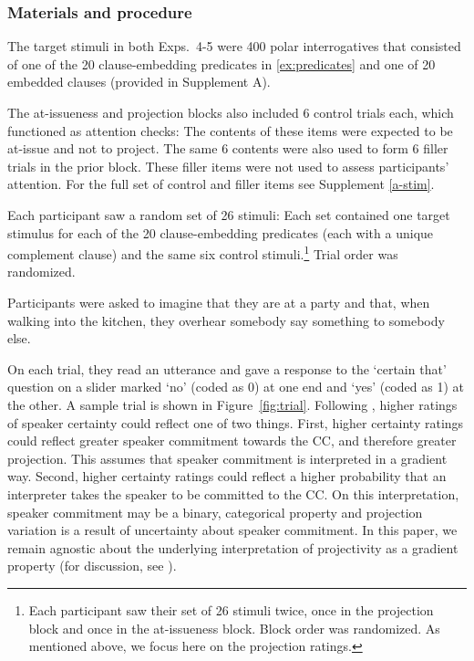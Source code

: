 \documentclass[times,linguex,xcolor]{glossa}
\begin{document}
    \subsubsection{Materials and procedure}
    
  The target stimuli in both Exps.~4-5 were 400 polar interrogatives that consisted of one of the 20 clause-embedding predicates in \ref{ex:predicates} and one of 20 embedded clauses (provided in Supplement A). 
    
    
    The at-issueness and projection blocks also included 6 control trials each, which functioned as attention checks: The contents of these items were expected to be at-issue and not to project. The same 6 contents were also used to form 6 filler trials in the prior block. These filler items were not used to assess participants' attention. For the full set of control and filler items see Supplement \ref{a-stim}.

              Each participant saw a random set of 26 stimuli: Each set contained one target stimulus for each of the 20 clause-embedding predicates (each with a unique complement clause) and the same six control stimuli.\footnote{Each participant saw their set of 26 stimuli twice, once in the projection block and once in the at-issueness block. Block order was randomized. As mentioned above, we focus here on the projection ratings.} Trial order was randomized.
  	
              Participants were asked to imagine that they are at a party and that, when walking into the kitchen, they overhear somebody say something to somebody else.
              
              On each trial, they read an utterance and gave a response to the `certain that' question on a slider marked `no' (coded as 0) at one end and `yes' (coded as 1) at the other. A sample trial %
              is shown in Figure~\ref{fig:trial}.            
              Following \citealt{tonhauser_how_2018}, higher ratings of speaker certainty could reflect one of two things. First, higher certainty ratings could reflect greater speaker commitment towards the CC, and therefore greater projection. This assumes that speaker commitment is interpreted in a gradient way. Second, higher certainty ratings could reflect a higher probability that an interpreter takes the speaker to be committed to the CC.  On this interpretation, speaker commitment may be a binary, categorical property and projection variation is a result of uncertainty about speaker commitment. In this paper, we remain agnostic about the underlying interpretation of projectivity as a gradient property (for discussion, see  \citealt{grove_factivity_2023}).
              
\end{document}
